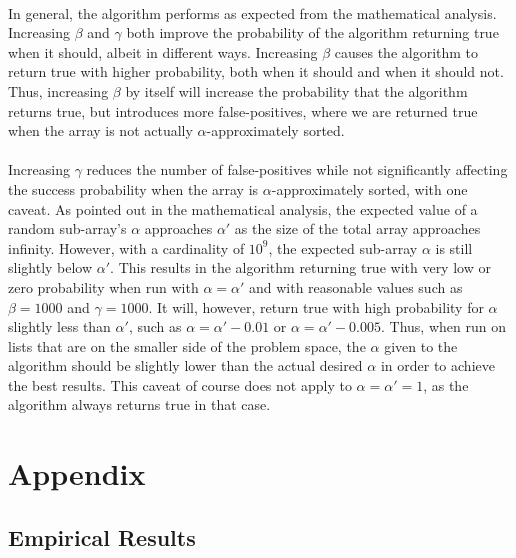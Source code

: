\documentclass{article}
\begin{document}
\paragraph{}In general, the algorithm performs as expected from the mathematical analysis. 
Increasing $\beta$ and $\gamma$ both improve the probability of the algorithm returning true when it should, albeit in different ways.
Increasing $\beta$ causes the algorithm to return true with higher probability, both when it should and when it should not.
Thus, increasing $\beta$ by itself will increase the probability that the algorithm returns true, but introduces more false-positives, where we are returned true when the array is not actually $\alpha$-approximately sorted.
\paragraph{}Increasing $\gamma$ reduces the number of false-positives while not significantly affecting the success probability when the array is $\alpha$-approximately sorted, with one caveat.
As pointed out in the mathematical analysis, the expected value of a random sub-array's $\alpha$ approaches $\alpha'$ as the size of the total array approaches infinity.
However, with a cardinality of $10^9$, the expected sub-array $\alpha$ is still slightly below $\alpha'$. 
This results in the algorithm returning true with very low or zero probability when run with $\alpha = \alpha'$ and with reasonable values such as $\beta = 1000$ and $\gamma = 1000$.
It will, however, return true with high probability for $\alpha$ slightly less than $\alpha'$, such as $\alpha = \alpha' - 0.01$ or $\alpha = \alpha' - 0.005$.
Thus, when run on lists that are on the smaller side of the problem space, the $\alpha$ given to the algorithm should be slightly lower than the actual desired $\alpha$ in order to achieve the best results.
This caveat of course does not apply to $\alpha = \alpha' = 1$, as the algorithm always returns true in that case.
\newpage
\section{Appendix}
\subsection{Empirical Results}
\end{document}
